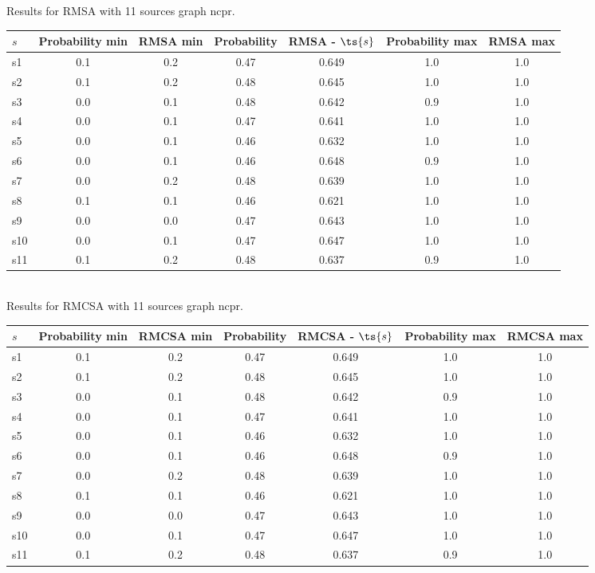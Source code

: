 \documentclass{article}
\begin{document}
\noindent Results for RMSA with 11 sources graph ncpr.

\noindent\begin{tabular}{|l|c|c|c|c|c|c|}
\hline
$s$& Probability min & RMSA min & Probability & RMSA - $\ts{s}$ & Probability max & RMSA max\\
\hline
s1 &0.1 & 0.2 & 0.47 & 0.649 & 1.0 & 1.0\\
\hline
s2 &0.1 & 0.2 & 0.48 & 0.645 & 1.0 & 1.0\\
\hline
s3 &0.0 & 0.1 & 0.48 & 0.642 & 0.9 & 1.0\\
\hline
s4 &0.0 & 0.1 & 0.47 & 0.641 & 1.0 & 1.0\\
\hline
s5 &0.0 & 0.1 & 0.46 & 0.632 & 1.0 & 1.0\\
\hline
s6 &0.0 & 0.1 & 0.46 & 0.648 & 0.9 & 1.0\\
\hline
s7 &0.0 & 0.2 & 0.48 & 0.639 & 1.0 & 1.0\\
\hline
s8 &0.1 & 0.1 & 0.46 & 0.621 & 1.0 & 1.0\\
\hline
s9 &0.0 & 0.0 & 0.47 & 0.643 & 1.0 & 1.0\\
\hline
s10 &0.0 & 0.1 & 0.47 & 0.647 & 1.0 & 1.0\\
\hline
s11 &0.1 & 0.2 & 0.48 & 0.637 & 0.9 & 1.0\\
\hline
\end{tabular}\\

\noindent Results for RMCSA with 11 sources graph ncpr.

\noindent\begin{tabular}{|l|c|c|c|c|c|c|}
\hline
$s$& Probability min & RMCSA min & Probability & RMCSA - $\ts{s}$ & Probability max & RMCSA max\\
\hline
s1 &0.1 & 0.2 & 0.47 & 0.649 & 1.0 & 1.0\\
\hline
s2 &0.1 & 0.2 & 0.48 & 0.645 & 1.0 & 1.0\\
\hline
s3 &0.0 & 0.1 & 0.48 & 0.642 & 0.9 & 1.0\\
\hline
s4 &0.0 & 0.1 & 0.47 & 0.641 & 1.0 & 1.0\\
\hline
s5 &0.0 & 0.1 & 0.46 & 0.632 & 1.0 & 1.0\\
\hline
s6 &0.0 & 0.1 & 0.46 & 0.648 & 0.9 & 1.0\\
\hline
s7 &0.0 & 0.2 & 0.48 & 0.639 & 1.0 & 1.0\\
\hline
s8 &0.1 & 0.1 & 0.46 & 0.621 & 1.0 & 1.0\\
\hline
s9 &0.0 & 0.0 & 0.47 & 0.643 & 1.0 & 1.0\\
\hline
s10 &0.0 & 0.1 & 0.47 & 0.647 & 1.0 & 1.0\\
\hline
s11 &0.1 & 0.2 & 0.48 & 0.637 & 0.9 & 1.0\\
\hline
\end{tabular}\\
\end{document}
